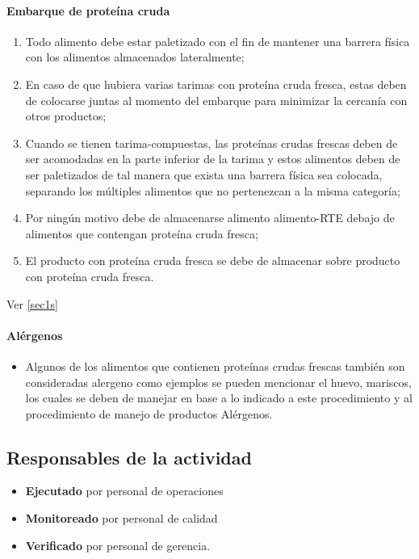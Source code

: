 \paragraph{Embarque de proteína cruda}

\begin{enumerate}
	\item Todo alimento debe estar paletizado con el fin de mantener una barrera física con los alimentos almacenados lateralmente;\label{sec1s}
	\item En caso de que hubiera varias tarimas con proteína cruda fresca, estas deben de colocarse juntas al momento del embarque para minimizar la cercanía con otros productos;
	\item Cuando se tienen \glspl{tarima-compuesta}, las proteínas crudas frescas deben de ser acomodadas en la parte inferior de la tarima y estos alimentos deben de ser paletizados de tal manera que exista una barrera física sea colocada, separando los múltiples alimentos que no pertenezcan a la misma categoría;
	\item Por ningún motivo debe de almacenarse alimento \gls{alimento-RTE} debajo de alimentos que contengan proteína cruda fresca;
	\item El producto con proteína cruda fresca se debe de almacenar sobre producto con proteína cruda fresca.
\end{enumerate}

Ver \cref{sec1s}

\paragraph{Alérgenos}

\begin{itemize}
	\item Algunos de los alimentos que contienen proteínas crudas frescas también son consideradas \gls{alergeno} como ejemplos se pueden mencionar el huevo, mariscos, los cuales se deben de manejar en base a lo indicado a este procedimiento y al procedimiento de manejo de productos Alérgenos.
\end{itemize}

\subsection{Responsables de la actividad}

\begin{itemize}
	\item \textbf{Ejecutado} por personal de operaciones
	\item \textbf{Monitoreado} por personal de calidad
	\item \textbf{Verificado} por personal de gerencia.
\end{itemize}


